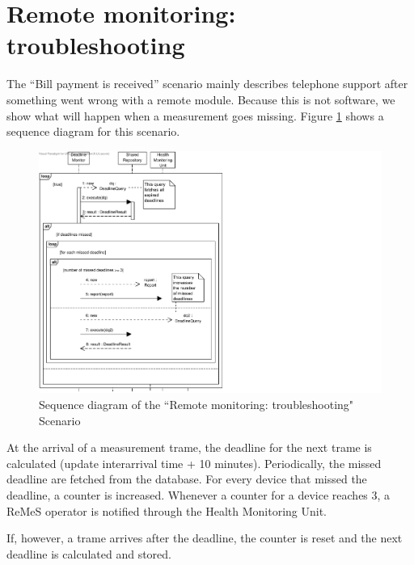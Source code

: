 \section{Remote monitoring: troubleshooting}
\label{scenario:rm-troubleshooting}

\npar The ``Bill payment is received'' scenario mainly describes telephone
support after something went wrong with a remote module. Because this is not
software, we show what will happen when a measurement goes missing. Figure
\ref{fig:scenario-5-3-3} shows a sequence diagram for this scenario.

\begin{figure}[H]
	\begin{centering}
		\includegraphics[width=\textwidth]{figs/scenario-5-3-3.pdf}
		\caption{Sequence diagram of the ``Remote monitoring: troubleshooting"
		Scenario}
		\label{fig:scenario-5-3-3}
	\end{centering}
\end{figure}

\npar At the arrival of a measurement trame, the deadline for the next trame is
calculated (update interarrival time + 10 minutes). Periodically, the
missed deadline are fetched from the database. For every device that missed the
deadline, a counter is increased. Whenever a counter for a device reaches 3, a
ReMeS operator is notified through the Health Monitoring Unit. 

\npar If, however, a trame arrives after the deadline, the counter is reset and
the next deadline is calculated and stored.
